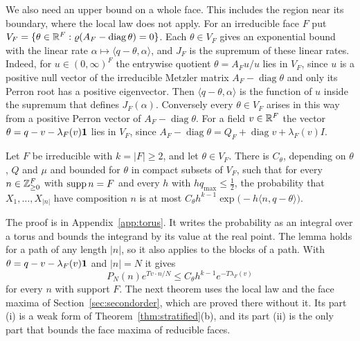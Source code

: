 We also need an upper bound on a whole face. This includes the region near its boundary, where the local law does not apply. For an irreducible face $F$ put
$V_F=\{\theta\in\mathbb{R}^F:\varrho(A_F-\operatorname{diag}\theta)=0\}$. Each
$\theta\in V_F$ gives an exponential bound with the linear rate
$\alpha\mapsto\langle q-\theta,\alpha\rangle$, and $J_F$ is the supremum of these
linear rates. Indeed, for $u\in(0,\infty)^F$ the entrywise quotient $\theta=A_Fu/u$
lies in $V_F$, since $u$ is a positive null vector of the irreducible
Metzler matrix $A_F-\operatorname{diag}\theta$ and only its Perron root has a
positive eigenvector. Then $\langle q-\theta,\alpha\rangle$ is the function of $u$
inside the supremum that defines $J_F(\alpha)$. Conversely every $\theta\in V_F$
arises in this way from a positive Perron vector of
$A_F-\operatorname{diag}\theta$. For a field $v\in\mathbb{R}^F$ the vector
$\theta=q-v-\lambda_F(v)\mathbf{1}$ lies in $V_F$, since
$A_F-\operatorname{diag}\theta=Q_F+\operatorname{diag}v+\lambda_F(v)I$.

\begin{lemma}\label{lem:upper}
Let $F$ be irreducible with $k=\lvert F\rvert\ge2$, and let $\theta\in V_F$.
There is $C_\theta$, depending on $\theta$, $Q$ and $\mu$ and bounded for $\theta$
in compact subsets of $V_F$, such that for every $n\in\mathbb{Z}_{\ge0}^F$ with
$\operatorname{supp} n=F$ and every $h$ with $hq_{\max}\le\frac12$, the probability that
$X_1,\dots,X_{\lvert n\rvert}$ have composition $n$ is at most
$C_\theta h^{k-1}\exp\bigl(-h\langle n,q-\theta\rangle\bigr)$.
\end{lemma}

The proof is in Appendix~\ref{app:torus}. It writes the probability as an integral
over a torus and bounds the integrand by its value at the real point. The lemma
holds for a path of any length $\lvert n\rvert$, so it also applies to the blocks of
a path. With $\theta=q-v-\lambda_F(v)\mathbf{1}$ and $\lvert n\rvert=N$ it gives
\begin{equation}\label{eq:upper-field}
 P_N(n)e^{Tv\cdot n/N}\le C_\theta h^{k-1}e^{-T\lambda_F(v)}
\end{equation}
for every $n$ with support $F$. The next theorem uses the local law and the
face maxima of Section~\ref{sec:secondorder}, which are proved there without
it. Its part (i) is a weak form of Theorem~\ref{thm:stratified}(b), and its part
(ii) is the only part that bounds the face maxima of reducible faces.

